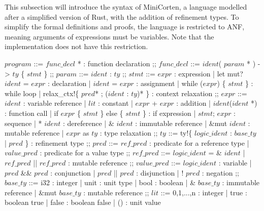 \documentclass{book}
\newcommand{\ccolon}[0]{: }
\newcommand{\cmid}[0]{| }
\newcommand{\cdisj}[0]{|| }
\theoremstyle{definition}
\begin{document}
This subsection will introduce the syntax of MiniCorten, a language modelled after a simplified version of Rust, with the addition of refinement types.
To simplify the formal definitions and proofs, the language is restricted to ANF, meaning arguments of expressions must be variables. Note that the implementation does not have this restriction.

\begin{bnfgrammar}
  $program$ ::=
    $func\_decl$ * : function declaration
  ;;
  $func\_decl$ ::=
    $ident$( $param$ * ) -> $ty$ \{ $stmt$ \}
  ;;
  $param$ ::= $ident$ \ccolon  $ty$
  ;;
  $stmt$ ::=
    $expr$                                                : expression
    | let mut? $ident$ = $expr$                           : declaration
    | $ident$ = $expr$                                    : assignment
    | while ($expr$) \{ $stmt$ \}                         : while loop
    | relax\_ctx!\{ $pred$* ; ($ident$ \ccolon $ty$)* \}  : context relaxation
  ;;
  $expr$ ::=
    $ident$                                         : variable reference
    | $lit$                                         : constant
    | $expr$ + $expr$                               : addition
    | $ident$($ident$ *)                            : function call
    | if $expr$ \{ $stmt$ \} else \{ $stmt$ \}      : if expression
    | $stmt$; $expr$                                : sequence
    | * $ident$                                     : dereference
    | \& $ident$                                    : immutable reference
    | \&mut $ident$                                 : mutable reference
    | $expr$ as $ty$                                : type relaxation
  ;;
  $ty$ ::= ty!\{ $logic\_ident$ \ccolon $base\_ty$ \cmid $pred$ \} : refinement type
  ;;
  $pred$ ::=
    $ref\_pred$                                     : predicate for a reference type
    | $value\_pred$                                 : predicate for a value type
  ;;
  $ref\_pred$ ::=
    $logic\_ident$ = \& $ident$
    | $ref\_pred$ \cdisj $ref\_pred$         : mutable reference
  ;;
  $value\_pred$ ::=
    $logic\_ident$                : variable
  | $pred$ \&\& $pred$            : conjunction
  | $pred$ \cdisj $pred$          : disjunction
  | ! $pred$                      : negation
  ;;
  $base\_ty$ ::=
    i32                     : integer
    | unit                  : unit type
    | bool                  : boolean
    | \& $base\_ty$         : immutable reference
    | \&mut $base\_ty$      : mutable reference
  ;;
  $lit$ ::=
      0,1,...,n             : integer
    | true                  : boolean true
    | false                 : boolean false
    | ()                    : unit value
\end{bnfgrammar}
\end{document}
